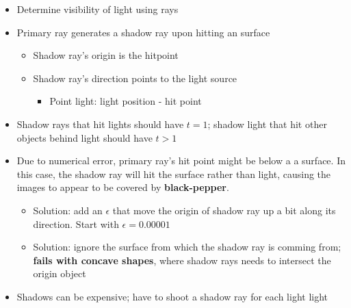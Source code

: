   \begin{itemize}
    \item Determine visibility of light using rays
    \item Primary ray generates a shadow ray upon hitting an surface
    \begin{itemize}
      \item Shadow ray's origin is the hitpoint
      \item Shadow ray's direction points to the light source
      \begin{itemize}
        \item Point light: light position - hit point
      \end{itemize}
    \end{itemize}

    \item Shadow rays that hit lights should have $ t = 1 $; shadow light
    that hit other objects behind light should have $ t > 1 $
    \item Due to numerical error, primary ray's hit point might be below a
    a surface. In this case, the shadow ray will hit the surface rather than
    light, causing the images to appear to be covered by \textbf{black-pepper}.
    \begin{itemize}
      \item Solution: add an $ \epsilon $ that move the origin of shadow ray
      up a bit along its direction. Start with $ \epsilon = 0.00001 $
      \item Solution: ignore the surface from which the shadow ray is comming
      from; \textbf{fails with concave shapes}, where shadow rays needs to
      intersect the origin object
    \end{itemize}

    \item Shadows can be expensive; have to shoot a shadow ray for each light
    light
  \end{itemize}
